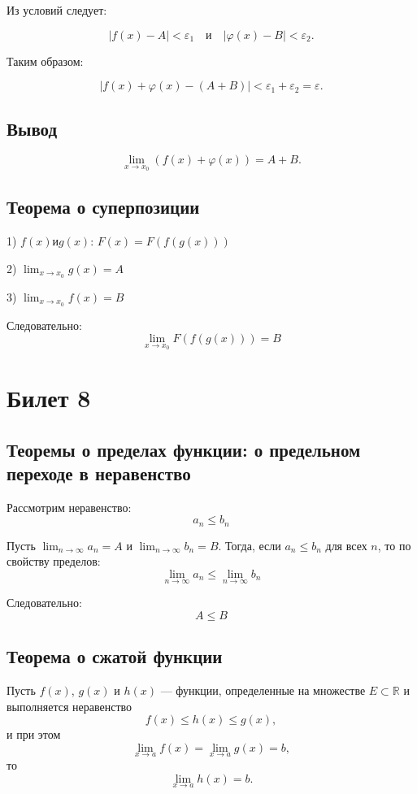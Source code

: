 \documentclass{article}
\begin{document}
Из условий следует:

\[
|f(x) - A| < \varepsilon_1 \quad \text{и} \quad |\varphi(x) - B| < \varepsilon_2.
\]

Таким образом:

\[
|f(x) + \varphi(x) - (A + B)| < \varepsilon_1 + \varepsilon_2 = \varepsilon.
\]

\subsection*{Вывод}
\[
\lim_{x \to x_0} (f(x) + \varphi(x)) = A + B.
\]

\subsection*{Теорема о суперпозиции}

1) \( f(x) и g(x) \): \( F(x) = F(f(g(x))) \)

2) \( \lim_{x \to x_0} g(x) = A \)

3) \( \lim_{x \to x_0} f(x) = B \)

Следовательно:
\[
\lim_{x \to x_0} F(f(g(x))) = B
\]

\section{Билет 8}

\subsection*{Теоремы о пределах функции: о предельном переходе в неравенство}

Рассмотрим неравенство:
\[
a_n \leq b_n
\]

Пусть \( \lim_{n \to \infty} a_n = A \) и \( \lim_{n \to \infty} b_n = B \). Тогда, если \( a_n \leq b_n \) для всех \( n \), то по свойству пределов:
\[
\lim_{n \to \infty} a_n \leq \lim_{n \to \infty} b_n
\]

Следовательно:
\[
A \leq B
\]

\subsection*{Теорема о сжатой функции}
Пусть \( f(x) \), \( g(x) \) и \( h(x) \) — функции, определенные на множестве \( E \subset \mathbb{R} \) и выполняется неравенство
\[
f(x) \leq h(x) \leq g(x),
\]
и при этом
\[
\lim_{x \to a} f(x) = \lim_{x \to a} g(x) = b,
\]
то
\[
\lim_{x \to a} h(x) = b.
\]
\end{document}

